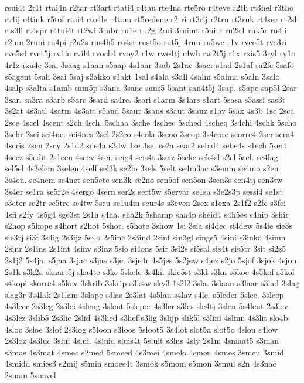 {rsui4t
2r1t
rtai4n
r2tar
rt3art
rtati4
r4tau
rte4na
rte5ro
r4teve
r2th
rt3hel
r3tho
rt4ij
r4tink
r5tof
rtoi4
rto4le
r4tom
rt5redene
r2tri
rt3rij
r2tru
rt3ruk
rt4sec
rt2sl
rts3li
rt4spr
r4tui4t
rt2wi
3rubr
ru1e
ru2g
2rui
3ruimt
r5uitr
ru2k1
ruk5r
ru4li
r2um
2runi
ru4pi
r2u2s
rus4h5
ru4st
rust5o
rut5j
4ruu
ru5we
r1v
rvee5t
rve3ri
rve5s4
rvet5j
rv1ic
rvil4
rvoch4
rvoy2
r1w
rwe4tj
r4wh
rw2t5j
r1x
rxis5
3ryl
ry1o
4r1z
rzu4e
3sa.
3saag
s1aan
s5aap
4s1aar
3sab
2s1ac
3sacr
s1ad
2s1af
sa2fe
5safo
s5agent
5sah
3sai
5saj
s3akko
s1akt
1sal
s4ala
s3all
4salm
s5alma
s5aln
3salo
4salp
s3alta
s1amb
sam5p
s3ana
3sanc
sans5
5sant
san4t5j
3sap.
s5ape
sap5l
2sar
3sar.
sa3ra
s3arb
s3arc
3sard
sa4re.
3sari
s1arm
3s4ars
s1art
5sasa
s3assi
sas3t
3s2at
4s3atl
4satm
4s3att
s5aud
5saur
3saus
s3aut
3sauz
s1av
5sax
4s3b
1sc
2sca
2sce
4scel
4scent
s2ch
4sch.
5schaa
3sche
4schec
5sched
4scheq
3s4chi
4schk
5scho
3schr
2sci
sci4ne.
sci4nes
2scl
2s2co
s4cola
3scoo
3scop
3s4core
scorre4
2scr
scra4
4scris
2scu
2scy
2s1d2
sde4a
s3dw
1se
3se.
se2a
sear2
sebal4
sebe4s
s1ech
5sect
4secz
s5edit
2s1een
4seev
4sei.
seig4
seis4t
3seiz
5seke
sek4sl
s2el
5sel.
se4lag
sel5el
4s3elem
3selen
4self
sel3k
se2lo
3sels
5selt
se4m3ac
s3emm
se4mo
s2en
3s4en.
se4nem
se4net
sen5ete
sen3k
se2no
sen5of
sen5on
3sen3s
sen4tj
sen3tw
3s4er
se1ra
se5r2e
4sergo
4sern
ser2s
sert5w
s5ervar
se1sa
s3e2s3p
sessi4
se1st
s3eter
se2tr
se5tre
se4tw
5seu
se1u4m
seur4s
s3even
2sex
s1exa
2s1f2
s2fe
s3fei
4sfi
s2fy
4s5g4
sge3st
2s1h
s4ha.
sha2k
5shamp
sha4p
sheid4
s4h5es
s4hip
3shir
s2hop
s5hope
s4hort
s2hot
5shot.
s5hote
3show
1si
3sia
si4dec
si4dew
5s4ie
sie3s
sie3tj
si3f
3s4ig
2s3ijz
5silo
2s5inc
2s3ind
2sinf
sin3gl
sings5
4sini
s3inko
4sinm
2sinr
2s1ins
2s1int
4sinv
s3inz
5sio
si4ons
5sir
3si2s
si5sal
sis4t
sis5tr
3sit
si2z5
2s1j2
5s4ja.
s5jaa
3sjac
s3jas
s3je.
3sje4r
4s5jes
5s2jew
s4jez
s2jo
5sjof
3sjok
4sjon
2s1k
s3k2a
skaart5j
ska4te
s3ke
5skele
3s4ki.
skie5st
s3kl
s3kn
s5koe
4s5kof
s5kol
s4kopi
skorre4
s5kov
3skrib
3skrip
s3k4w
sky3
1s2l2
3sla.
3slaan
s3laar
s3lad
3slag
slag3r
3s4lak
2s1lam
3slape
s3las
2s3lat
4s5lau
s4lav
s4le.
s5leder
5slee.
3sleep
4s3leer
2s3leg
2s3lei
4sleng
3slent
5sleper
4s3ler
s3les
sle4tj
3sleu
5s4leut
2s3lev
4s3lez
3slib5
2s3lic
2slid
4s3lied
s3lief
s3lig
3slijp
slik5l
s3lini
4slinn
4s3lit
slo4b
4sloc
3sloe
3slof
2s3log
s5loon
s3loos
5sloot5
3s4lot
slot5a
slot5o
4slou
s4low
2s3loz
4s3luc
3slui
4slui.
4sluid
sluis4t
5sluit
s3lus
4sly
2s1m
4smaat5
s3man
s3mas
4s3mat
4smec
s2med
5smeed
4s3mei
4smelo
4smen
4smes
3smeu
3smid.
4smidd
smies3
s2mij
s5min
smoes4t
3smok
s5mom
s5mon
3smul
s2n
4s3nac
2snam
5snavel
}
